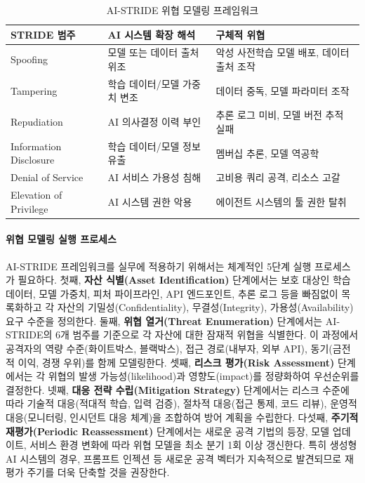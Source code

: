 \begin{table}[htbp]
\centering
\caption{AI-STRIDE 위협 모델링 프레임워크}
\label{tab:ai_stride}
\begin{tabularx}{\textwidth}{p{3cm}XX}
\toprule
\textbf{STRIDE 범주} & \textbf{AI 시스템 확장 해석} & \textbf{구체적 위협} \\
\midrule
Spoofing & 모델 또는 데이터 출처 위조 & 악성 사전학습 모델 배포, 데이터 출처 조작 \\
Tampering & 학습 데이터/모델 가중치 변조 & 데이터 중독, 모델 파라미터 조작 \\
Repudiation & AI 의사결정 이력 부인 & 추론 로그 미비, 모델 버전 추적 실패 \\
Information Disclosure & 학습 데이터/모델 정보 유출 & 멤버십 추론\cite{shokri2017membership}, 모델 역공학 \\
Denial of Service & AI 서비스 가용성 침해 & 고비용 쿼리 공격, 리소스 고갈 \\
Elevation of Privilege & AI 시스템 권한 악용 & 에이전트 시스템의 툴 권한 탈취 \\
\bottomrule
\end{tabularx}
\end{table}

\paragraph{위협 모델링 실행 프로세스}

AI-STRIDE 프레임워크를 실무에 적용하기 위해서는 체계적인 5단계 실행 프로세스가 필요하다. 첫째, \textbf{자산 식별(Asset Identification)} 단계에서는 보호 대상인 학습 데이터, 모델 가중치, 피처 파이프라인, API 엔드포인트, 추론 로그 등을 빠짐없이 목록화하고 각 자산의 기밀성(Confidentiality), 무결성(Integrity), 가용성(Availability) 요구 수준을 정의한다. 둘째, \textbf{위협 열거(Threat Enumeration)} 단계에서는 AI-STRIDE의 6개 범주를 기준으로 각 자산에 대한 잠재적 위협을 식별한다. 이 과정에서 공격자의 역량 수준(화이트박스, 블랙박스), 접근 경로(내부자, 외부 API), 동기(금전적 이익, 경쟁 우위)를 함께 모델링한다. 셋째, \textbf{리스크 평가(Risk Assessment)} 단계에서는 각 위협의 발생 가능성(likelihood)과 영향도(impact)를 정량화하여 우선순위를 결정한다. 넷째, \textbf{대응 전략 수립(Mitigation Strategy)} 단계에서는 리스크 수준에 따라 기술적 대응(적대적 학습, 입력 검증), 절차적 대응(접근 통제, 코드 리뷰), 운영적 대응(모니터링, 인시던트 대응 체계)을 조합하여 방어 계획을 수립한다. 다섯째, \textbf{주기적 재평가(Periodic Reassessment)} 단계에서는 새로운 공격 기법의 등장, 모델 업데이트, 서비스 환경 변화에 따라 위협 모델을 최소 분기 1회 이상 갱신한다. 특히 생성형 AI 시스템의 경우, 프롬프트 인젝션 등 새로운 공격 벡터가 지속적으로 발견되므로 재평가 주기를 더욱 단축할 것을 권장한다.

